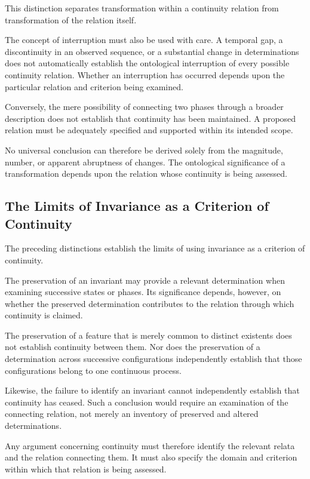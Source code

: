 This distinction separates transformation
within a continuity relation from transformation
of the relation itself.

The concept of interruption must also be used
with care. A temporal gap, a discontinuity
in an observed sequence, or a substantial
change in determinations does not automatically
establish the ontological interruption of
every possible continuity relation. Whether
an interruption has occurred depends upon
the particular relation and criterion being
examined.

Conversely, the mere possibility of connecting
two phases through a broader description
does not establish that continuity has been
maintained. A proposed relation must be
adequately specified and supported within
its intended scope.

No universal conclusion can therefore be
derived solely from the magnitude, number,
or apparent abruptness of changes. The
ontological significance of a transformation
depends upon the relation whose continuity
is being assessed.

\subsection{The Limits of Invariance as a Criterion of Continuity}

The preceding distinctions establish the
limits of using invariance as a criterion
of continuity.

The preservation of an invariant may provide
a relevant determination when examining
successive states or phases. Its significance
depends, however, on whether the preserved
determination contributes to the relation
through which continuity is claimed.

The preservation of a feature that is merely
common to distinct existents does not establish
continuity between them. Nor does the
preservation of a determination across
successive configurations independently
establish that those configurations belong
to one continuous process.

Likewise, the failure to identify an invariant
cannot independently establish that continuity
has ceased. Such a conclusion would require
an examination of the connecting relation,
not merely an inventory of preserved and
altered determinations.

Any argument concerning continuity must
therefore identify the relevant relata and
the relation connecting them. It must also
specify the domain and criterion within
which that relation is being assessed.

